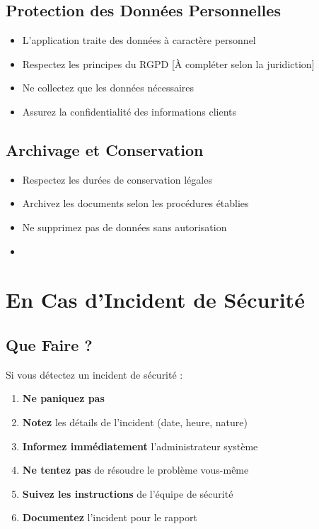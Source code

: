 \documentclass[12pt,a4paper]{report}
\begin{document}
\subsection{Protection des Données Personnelles}

\begin{itemize}[leftmargin=*]
    \item L'application traite des données à caractère personnel
    \item Respectez les principes du RGPD [À compléter selon la juridiction]
    \item Ne collectez que les données nécessaires
    \item Assurez la confidentialité des informations clients
\end{itemize}

\subsection{Archivage et Conservation}

\begin{itemize}[leftmargin=*]
    \item Respectez les durées de conservation légales
    \item Archivez les documents selon les procédures établies
    \item Ne supprimez pas de données sans autorisation
    \item [À compléter : durées de conservation spécifiques]
\end{itemize}

\section{En Cas d'Incident de Sécurité}

\subsection{Que Faire ?}

Si vous détectez un incident de sécurité :

\begin{enumerate}[leftmargin=*]
    \item \textbf{Ne paniquez pas}
    \item \textbf{Notez} les détails de l'incident (date, heure, nature)
    \item \textbf{Informez immédiatement} l'administrateur système
    \item \textbf{Ne tentez pas} de résoudre le problème vous-même
    \item \textbf{Suivez les instructions} de l'équipe de sécurité
    \item \textbf{Documentez} l'incident pour le rapport
\end{enumerate}
\end{document}
